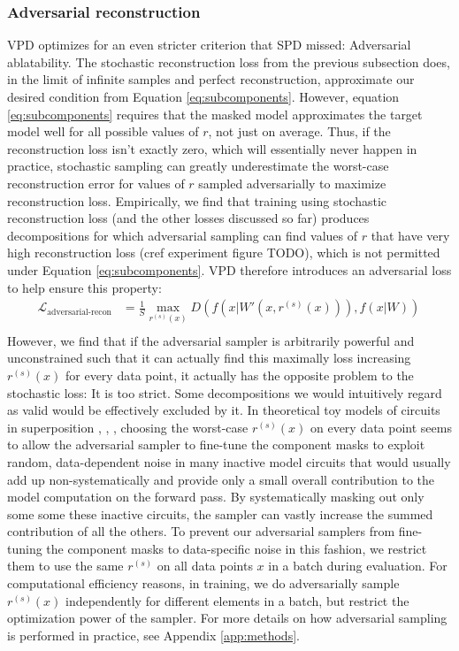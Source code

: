 \documentclass{article}
\begin{document}
\subsubsection{Adversarial reconstruction}
VPD optimizes for an even stricter criterion that SPD missed: Adversarial ablatability.
The stochastic reconstruction loss from the previous subsection does, in the limit of infinite samples and perfect reconstruction, approximate our desired condition from Equation \ref{eq:subcomponents}. However, equation \ref{eq:subcomponents} requires that the masked model approximates the target model well for all possible values of $r$, not just on average. Thus, if the reconstruction loss isn't exactly zero, which will essentially never happen in practice, stochastic sampling can greatly underestimate the worst-case reconstruction error for values of $r$ sampled adversarially to maximize reconstruction loss. Empirically, we find that training using stochastic reconstruction loss (and the other losses discussed so far) produces decompositions for which adversarial sampling can find values of $r$ that have very high reconstruction loss (cref experiment figure TODO), which is not permitted under Equation \ref{eq:subcomponents}. VPD therefore introduces an adversarial loss to help ensure this property: 
\begin{equation}\label{eq:adv_recon} 
\begin{aligned}
\mathcal{L}_{\text{adversarial-recon}}&=\frac{1}{S} \max_{r^{(s)}(x)} D \left( f(x\vert W'(x,r^{(s)}(x))),f(x\vert W) \right)\,\\
\end{aligned}
\end{equation}
However, we find that if the adversarial sampler is arbitrarily powerful and unconstrained such that it can actually find this maximally loss increasing $r^{(s)}(x)$ for every data point, it actually has the opposite problem to the stochastic loss: It is too strict. Some decompositions we would intuitively regard as valid would be effectively excluded by it. In theoretical toy models of circuits in superposition \cite{hänni2024mathematicalmodelscomputationsuperposition}, \cite{bushnaq2024circuits}, \cite{linsefors2025circuits}, choosing the worst-case $r^{(s)}(x)$ on every data point seems to allow the adversarial sampler to fine-tune the component masks to exploit random, data-dependent noise in many inactive model circuits that would usually add up non-systematically and provide only a small overall contribution to the model computation on the forward pass. By systematically masking out only some some these inactive circuits, the sampler can vastly increase the summed contribution of all the others. To prevent our adversarial samplers from fine-tuning the component masks to data-specific noise in this fashion, we restrict them to use the same $r^{(s)}$ on all data points $x$ in a batch during evaluation. For computational efficiency reasons, in training, we do adversarially sample $r^{(s)}(x)$ independently for different elements in a batch, but restrict the optimization power of the sampler. For more details on how adversarial sampling is performed in practice, see Appendix \ref{app:methods}.
\end{document}
